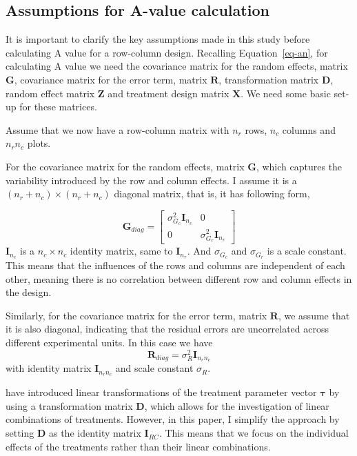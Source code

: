 \documentclass[
  a4paper,
  oneside,
  openany,
  12pt,
  onecolumn]{book}
\theoremstyle{definition}
\theoremstyle{definition}
\theoremstyle{plain}
\theoremstyle{remark}
\begin{document}
\subsection{Assumptions for A-value
calculation}\label{assumptions-for-a-value-calculation}

It is important to clarify the key assumptions made in this study before
calculating A value for a row-column design. Recalling
Equation~\ref{eq-an}, for calculating A value we need the covariance
matrix for the random effects, matrix \(\boldsymbol{G}\), covariance
matrix for the error term, matrix \(\boldsymbol{R}\), transformation
matrix \(\boldsymbol{D}\), random effect matrix \(\boldsymbol{Z}\) and
treatment design matrix \(\boldsymbol{X}\). We need some basic set-up
for these matrices.

Assume that we now have a row-column matrix with \(n_r\) rows, \(n_c\)
columns and \(n_rn_c\) plots.

For the covariance matrix for the random effects, matrix
\(\boldsymbol{G}\), which captures the variability introduced by the row
and column effects. I assume it is a \((n_r+n_c)\times(n_r+n_c)\)
diagonal matrix, that is, it has following form,

\[
\boldsymbol{G}_{diag} =
\begin{bmatrix}
\sigma_{G_c}^2\boldsymbol{I}_{n_c} & 0 \\
0 & \sigma_{G_r}^2\boldsymbol{I}_{n_r}
\end{bmatrix}
\] \(\boldsymbol{I}_{n_c}\) is a \({n_c}\times{n_c}\) identity matrix,
same to \(\boldsymbol{I}_{n_r}\). And \(\sigma_{G_c}\) and
\(\sigma_{G_r}\) is a scale constant. This means that the influences of
the rows and columns are independent of each other, meaning there is no
correlation between different row and column effects in the design.

Similarly, for the covariance matrix for the error term, matrix
\(\boldsymbol{R}\), we assume that it is also diagonal, indicating that
the residual errors are uncorrelated across different experimental
units. In this case we have \[
\boldsymbol{R}_{diag} = \sigma_{R}^2\boldsymbol{I}_{n_rn_c}
\] with identity matrix \(\boldsymbol{I}_{n_rn_c}\) and scale constant
\(\sigma_{R}\).

\citet{butler2013optimal} have introduced linear transformations of the
treatment parameter vector \(\boldsymbol{\tau}\) by using a
transformation matrix \(\boldsymbol{D}\), which allows for the
investigation of linear combinations of treatments. However, in this
paper, I simplify the approach by setting \(\boldsymbol{D}\) as the
identity matrix \(\boldsymbol{I}_{RC}\). This means that we focus on the
individual effects of the treatments rather than their linear
combinations.
\end{document}
